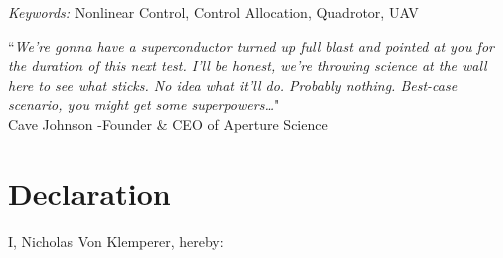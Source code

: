 \documentclass[a4paper, 11pt, oneside, openright, parskip=full]{book}
\newcommand{\auth}{Nicholas Von Klemperer}								%
\newcommand{\key}{Nonlinear Control, Control Allocation, Quadrotor, UAV}					   %
\begin{document}
\begin{titlepage}
		\vskip 15mm	
	\begin{normalsize}				
		{\itshape Keywords:}
		\key			
	\end{normalsize}	
\end{titlepage}
\afterpage{\null\newpage}
\frontmatter
\begin{center}
\begin{minipage}{0.7\textwidth}
\centering
``\emph{We're gonna have a superconductor turned up full blast and pointed at you for the duration of this next test. I'll be honest, we're throwing science at the wall here to see what sticks. No idea what it'll do. Probably nothing. Best-case scenario, you might get some superpowers\ldots}"
\\
Cave Johnson -Founder \& CEO of Aperture Science
\end{minipage}
\end{center}
\chapter{Declaration}				
\label{ch:decl}
I, \auth,  hereby:
\end{document}
